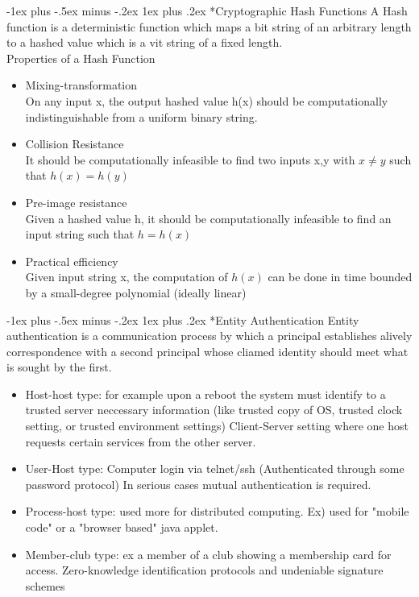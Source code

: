 \documentclass[3pt,landscape]{article}
\makeatletter
\renewcommand{\subsubsection}{\@startsection{subsubsection}{3}{0mm}%
                            {-1ex plus -.5ex minus -.2ex}%
                            {1ex plus .2ex}%
                            {\normalfont\small\bfseries}}
\makeatother
\begin{document}
\begin{multicols}{3}
\subsubsection*{Cryptographic Hash Functions}
A Hash function is a deterministic function which maps a bit string of an arbitrary length to a hashed value which is a vit string of a fixed length.\\
\vspace{2 mm}
Properties of a Hash Function
\begin{itemize}
    \item Mixing-transformation\\
        On any input x, the output hashed value h(x) should be computationally indistinguishable from a uniform binary string.
    \item Collision Resistance\\
        It should be computationally infeasible to find two inputs x,y with \(x \neq y\) such that \(h(x)=h(y)\)
    \item Pre-image resistance\\
        Given a hashed value h, it should be computationally infeasible to find an input string such that \(h=h(x)\)
    \item Practical efficiency\\
        Given input string x, the computation of \(h(x)\) can be done in time bounded by a small-degree polynomial (ideally linear)
\end{itemize}


\subsubsection*{Entity Authentication}
Entity authentication is a communication process by which a principal establishes alively correspondence with a second principal whose cliamed identity should meet what is sought by the first.
\begin{itemize}
    \item Host-host type: for example upon a reboot the system must identify to a trusted server neccessary information (like trusted copy of OS, trusted clock setting, or 
trusted environment settings) Client-Server setting where one host requests certain services from the other server.
    \item User-Host type: Computer login via telnet/ssh (Authenticated through some password protocol) In serious cases mutual authentication is required.
    \item Process-host type: used more for distributed computing. Ex) used for "mobile code" or a "browser based" java applet.
    \item Member-club type: ex a member of a club showing a membership card for access. Zero-knowledge identification protocols and undeniable signature schemes
\end{itemize}


\end{multicols}
\end{document}
